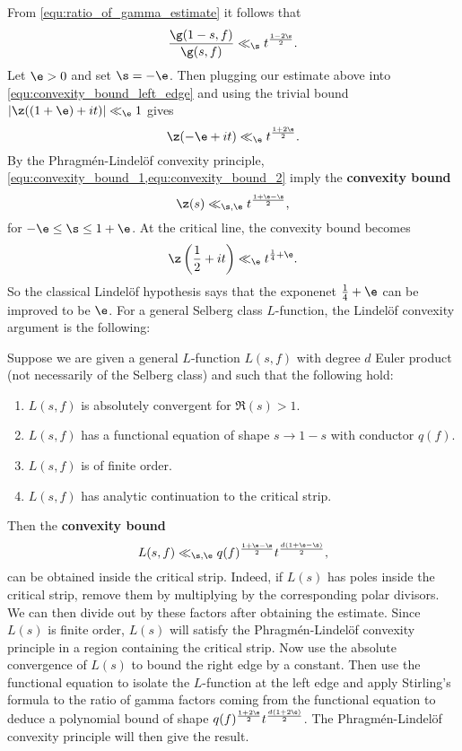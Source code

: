     From \cref{equ:ratio_of_gamma_estimate} it follows that
    \[
      \frac{\g(1-s,f)}{\g(s,f)} \ll_{\s} t^{\frac{1-2\s}{2}}.
    \]
    Let $\e > 0$ and set $\s = -\e$. Then plugging our estimate above into \cref{equ:convexity_bound_left_edge} and using the trivial bound $|\z((1+\e)+it)| \ll_{\e} 1$ gives
    \begin{equation}\label{equ:convexity_bound_2}
      \z(-\e+it) \ll_{\e} t^{\frac{1+2\e}{2}}.
    \end{equation}
    By the Phragm\'en-Lindel\"of convexity principle, \cref{equ:convexity_bound_1,equ:convexity_bound_2} imply the \textbf{convexity bound}
    \[
      \z(s) \ll_{\s,\e} t^{\frac{1+\e-\s}{2}},
    \]
    for $-\e \le \s \le 1+\e$. At the critical line, the convexity bound becomes
    \begin{equation}\label{equ:convexity_bound_zeta_function}
      \z\left(\frac{1}{2}+it\right) \ll_{\e} t^{\frac{1}{4}+\e}.
    \end{equation}
    So the classical Lindel\"of hypothesis says that the exponenet $\frac{1}{4}+\e$ can be improved to be $\e$. For a general Selberg class $L$-function, the Lindel\"of convexity argument is the following:

    \begin{method}
      Suppose we are given a general $L$-function $L(s,f)$ with degree $d$ Euler product (not necessarily of the Selberg class) and such that the following hold:
      \begin{enumerate}[label=(\roman*)]
        \item $L(s,f)$ is absolutely convergent for $\Re(s) > 1$.
        \item $L(s,f)$ has a functional equation of shape $s \to 1-s$ with conductor $q(f)$.
        \item $L(s,f)$ is of finite order.
        \item $L(s,f)$ has analytic continuation to the critical strip.
      \end{enumerate}
      Then the \textbf{convexity bound}
      \[
        L(s,f) \ll_{\s,\e} q(f)^{\frac{1+\e-\s}{2}}t^{\frac{d(1+\e-\s)}{2}},
      \]
      can be obtained inside the critical strip. Indeed, if $L(s)$ has poles inside the critical strip, remove them by multiplying by the corresponding polar divisors. We can then divide out by these factors after obtaining the estimate. Since $L(s)$ is finite order, $L(s)$ will satisfy the Phragm\'en-Lindel\"of convexity principle in a region containing the critical strip. Now use the absolute convergence of $L(s)$ to bound the right edge by a constant. Then use the functional equation to isolate the $L$-function at the left edge and apply Stirling's formula to the ratio of gamma factors coming from the functional equation to deduce a polynomial bound of shape $q(f)^{\frac{1+2\e}{2}}t^{\frac{d(1+2\e)}{2}}$. The Phragm\'en-Lindel\"of convexity principle will then give the result.
    \end{method}

